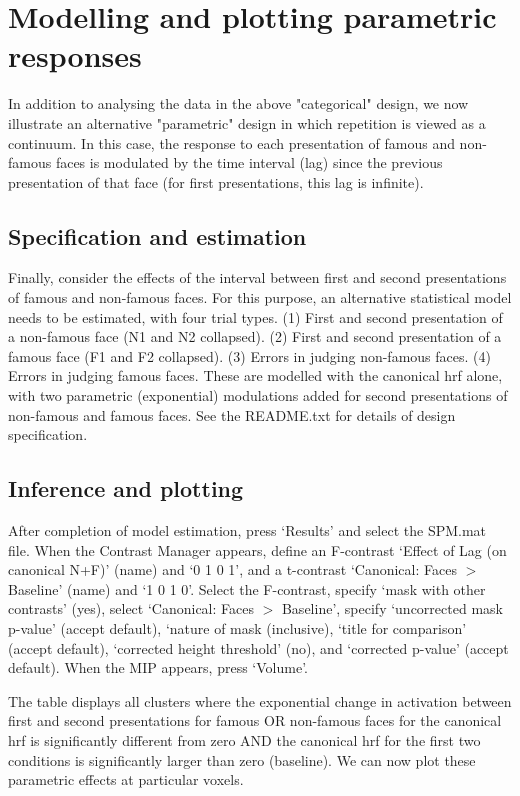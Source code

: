 \section{Modelling and plotting parametric responses}

In addition to analysing the data in the above "categorical" design, we now illustrate an alternative "parametric" design in which repetition is viewed as a continuum. In this case, the response to each presentation of famous and non-famous faces is modulated by the time interval (lag) since the previous presentation of that face (for first presentations, this lag is infinite). 

\subsection{Specification and estimation}

Finally, consider the effects of the interval between first and second presentations of famous and non-famous faces. For this purpose, an alternative statistical model needs to be estimated, with four trial types. (1) First and second presentation of a non-famous face (N1 and N2 collapsed). (2) First and second presentation of a famous face (F1 and F2 collapsed). (3) Errors in judging non-famous faces. (4) Errors in judging famous faces. These are modelled with the canonical hrf alone, with two parametric (exponential) modulations added for second presentations of non-famous and famous faces. See the README.txt for details of design specification.

\subsection{Inference and plotting}

After completion of model estimation, press `Results' and select the SPM.mat file. When the Contrast Manager appears, define an F-contrast `Effect of Lag (on canonical N+F)' (name) and `0 1 0 1', and a t-contrast `Canonical: Faces $>$ Baseline' (name) and `1 0 1 0'. Select the F-contrast, specify `mask with other contrasts' (yes), select `Canonical: Faces $>$ Baseline', specify `uncorrected mask p-value' (accept default), `nature of mask (inclusive), `title for comparison' (accept default), `corrected height threshold' (no), and `corrected p-value' (accept default). When the MIP appears, press `Volume'.

The table displays all clusters where the exponential change in activation between first and second presentations for famous OR non-famous faces for the canonical hrf is significantly different from zero AND the canonical hrf for the first two conditions is significantly larger than zero (baseline). We can now plot these parametric effects at particular voxels.

